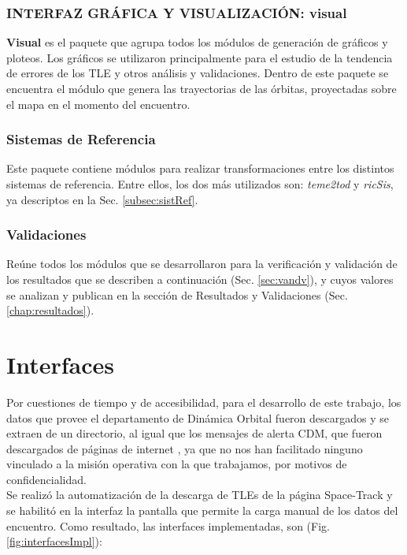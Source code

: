 \subsubsection*{INTERFAZ GR\'AFICA Y VISUALIZACI\'ON: visual}
{\bf{Visual}} es el paquete que agrupa todos los m\'odulos de generaci\'on de gr\'aficos y ploteos. Los gr\'aficos se utilizaron principalmente para el estudio de la tendencia de errores de los TLE y otros an\'alisis y validaciones.
Dentro de este paquete se encuentra el m\'odulo que genera las trayectorias de las \'orbitas, proyectadas sobre el mapa en el momento del encuentro.\\

\subsubsection*{Sistemas de Referencia}
Este paquete contiene m\'odulos para realizar transformaciones entre los distintos sistemas de referencia. Entre ellos, los dos m\'as utilizados son:
{\it{teme2tod}} y {\it{ricSis}}, ya descriptos en la Sec. \ref{subsec:sistRef}.

\subsubsection*{Validaciones}
Re\'une todos los m\'odulos que se desarrollaron para la verificaci\'on y validaci\'on de los resultados que se describen a continuaci\'on (Sec. \ref{sec:vandv}), y cuyos valores se analizan y publican en la secci\'on de Resultados y Validaciones (Sec. \ref{chap:resultados}).

\section{Interfaces}
Por cuestiones de tiempo y de accesibilidad, para el desarrollo de este trabajo, los datos que provee el departamento de Din\'amica Orbital fueron descargados y se extraen de un directorio, al igual que los mensajes de alerta CDM, que fueron descargados de p\'aginas de internet , ya que no nos han facilitado ninguno vinculado a la misi\'on operativa con la que trabajamos, por motivos de confidencialidad.\\

Se realiz\'o la automatizaci\'on de la descarga de TLEs de la p\'agina Space-Track y se habilit\'o en la interfaz la pantalla que permite la carga manual de los datos del encuentro. Como resultado, las interfaces implementadas, son (Fig. \ref{fig:interfacesImpl}):
 

